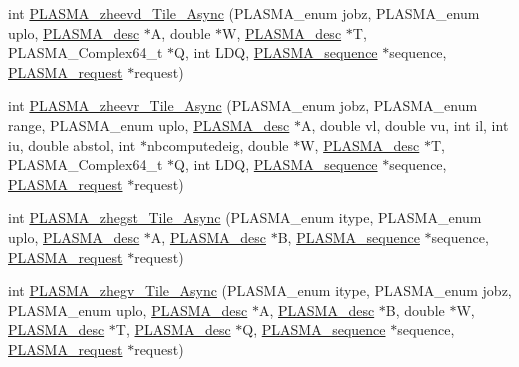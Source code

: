 \begin{DoxyCompactItemize}
\item 
int \hyperlink{group__PLASMA__Complex64__t__Tile__Async_ga6a7d30d39380d93ed1aacc15a79bde8f_ga6a7d30d39380d93ed1aacc15a79bde8f}{P\+L\+A\+S\+M\+A\+\_\+zheevd\+\_\+\+Tile\+\_\+\+Async} (P\+L\+A\+S\+M\+A\+\_\+enum jobz, P\+L\+A\+S\+M\+A\+\_\+enum uplo, \hyperlink{structplasma__desc__t}{P\+L\+A\+S\+M\+A\+\_\+desc} $\ast$A, double $\ast$W, \hyperlink{structplasma__desc__t}{P\+L\+A\+S\+M\+A\+\_\+desc} $\ast$T, P\+L\+A\+S\+M\+A\+\_\+\+Complex64\+\_\+t $\ast$Q, int L\+D\+Q, \hyperlink{structplasma__sequence__t}{P\+L\+A\+S\+M\+A\+\_\+sequence} $\ast$sequence, \hyperlink{structplasma__request__t}{P\+L\+A\+S\+M\+A\+\_\+request} $\ast$request)
\item 
int \hyperlink{group__PLASMA__Complex64__t__Tile__Async_ga9d97579dfd99bfa9ae07e984efdad07b_ga9d97579dfd99bfa9ae07e984efdad07b}{P\+L\+A\+S\+M\+A\+\_\+zheevr\+\_\+\+Tile\+\_\+\+Async} (P\+L\+A\+S\+M\+A\+\_\+enum jobz, P\+L\+A\+S\+M\+A\+\_\+enum range, P\+L\+A\+S\+M\+A\+\_\+enum uplo, \hyperlink{structplasma__desc__t}{P\+L\+A\+S\+M\+A\+\_\+desc} $\ast$A, double vl, double vu, int il, int iu, double abstol, int $\ast$nbcomputedeig, double $\ast$W, \hyperlink{structplasma__desc__t}{P\+L\+A\+S\+M\+A\+\_\+desc} $\ast$T, P\+L\+A\+S\+M\+A\+\_\+\+Complex64\+\_\+t $\ast$Q, int L\+D\+Q, \hyperlink{structplasma__sequence__t}{P\+L\+A\+S\+M\+A\+\_\+sequence} $\ast$sequence, \hyperlink{structplasma__request__t}{P\+L\+A\+S\+M\+A\+\_\+request} $\ast$request)
\item 
int \hyperlink{group__PLASMA__Complex64__t__Tile__Async_ga2b7df2f947d4f57750cf4f0145c80624_ga2b7df2f947d4f57750cf4f0145c80624}{P\+L\+A\+S\+M\+A\+\_\+zhegst\+\_\+\+Tile\+\_\+\+Async} (P\+L\+A\+S\+M\+A\+\_\+enum itype, P\+L\+A\+S\+M\+A\+\_\+enum uplo, \hyperlink{structplasma__desc__t}{P\+L\+A\+S\+M\+A\+\_\+desc} $\ast$A, \hyperlink{structplasma__desc__t}{P\+L\+A\+S\+M\+A\+\_\+desc} $\ast$B, \hyperlink{structplasma__sequence__t}{P\+L\+A\+S\+M\+A\+\_\+sequence} $\ast$sequence, \hyperlink{structplasma__request__t}{P\+L\+A\+S\+M\+A\+\_\+request} $\ast$request)
\item 
int \hyperlink{group__PLASMA__Complex64__t__Tile__Async_ga0a534f6761d13d19f35b9944934bff2e_ga0a534f6761d13d19f35b9944934bff2e}{P\+L\+A\+S\+M\+A\+\_\+zhegv\+\_\+\+Tile\+\_\+\+Async} (P\+L\+A\+S\+M\+A\+\_\+enum itype, P\+L\+A\+S\+M\+A\+\_\+enum jobz, P\+L\+A\+S\+M\+A\+\_\+enum uplo, \hyperlink{structplasma__desc__t}{P\+L\+A\+S\+M\+A\+\_\+desc} $\ast$A, \hyperlink{structplasma__desc__t}{P\+L\+A\+S\+M\+A\+\_\+desc} $\ast$B, double $\ast$W, \hyperlink{structplasma__desc__t}{P\+L\+A\+S\+M\+A\+\_\+desc} $\ast$T, \hyperlink{structplasma__desc__t}{P\+L\+A\+S\+M\+A\+\_\+desc} $\ast$Q, \hyperlink{structplasma__sequence__t}{P\+L\+A\+S\+M\+A\+\_\+sequence} $\ast$sequence, \hyperlink{structplasma__request__t}{P\+L\+A\+S\+M\+A\+\_\+request} $\ast$request)

\end{DoxyCompactItemize}
